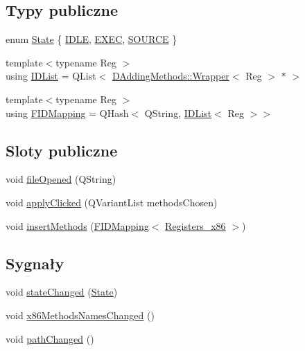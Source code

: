 \subsection*{Typy publiczne}
\begin{DoxyCompactItemize}
\item 
enum \hyperlink{class_application_manager_aeb5af7a2aa47623af5160ea1f20d0243}{State} \{ \hyperlink{class_application_manager_aeb5af7a2aa47623af5160ea1f20d0243a927b180d946b02d50c48311dbf9c3673}{I\-D\-L\-E}, 
\hyperlink{class_application_manager_aeb5af7a2aa47623af5160ea1f20d0243ab12e09b9d69a153189e8f821e9090d2c}{E\-X\-E\-C}, 
\hyperlink{class_application_manager_aeb5af7a2aa47623af5160ea1f20d0243ab5082059863677e68b76bfc68e21e882}{S\-O\-U\-R\-C\-E}
 \}
\item 
{\footnotesize template$<$typename Reg $>$ }\\using \hyperlink{class_application_manager_afc6759e44d61ba108cadcea101b30bc7}{I\-D\-List} = Q\-List$<$ \hyperlink{class_d_adding_methods_1_1_wrapper}{D\-Adding\-Methods\-::\-Wrapper}$<$ Reg $>$ $\ast$ $>$
\item 
{\footnotesize template$<$typename Reg $>$ }\\using \hyperlink{class_application_manager_a00564f65d5da07b75a4dc0d0d13c2dc1}{F\-I\-D\-Mapping} = Q\-Hash$<$ Q\-String, \hyperlink{class_application_manager_afc6759e44d61ba108cadcea101b30bc7}{I\-D\-List}$<$ Reg $>$$>$
\end{DoxyCompactItemize}
\subsection*{Sloty publiczne}
\begin{DoxyCompactItemize}
\item 
void \hyperlink{class_application_manager_abbab98616d4848114b4338c8accedef2}{file\-Opened} (Q\-String)
\item 
void \hyperlink{class_application_manager_af1a9357249748e88cdbbcb994d8a7fe0}{apply\-Clicked} (Q\-Variant\-List methods\-Chosen)
\item 
void \hyperlink{class_application_manager_ace0c5e4596d968278acd0b61042472d2}{insert\-Methods} (\hyperlink{class_application_manager_a00564f65d5da07b75a4dc0d0d13c2dc1}{F\-I\-D\-Mapping}$<$ \hyperlink{codedefines_8h_a0f84efe4ca4d99203713a78bd6e8c82e}{Registers\-\_\-x86} $>$)
\end{DoxyCompactItemize}
\subsection*{Sygnały}
\begin{DoxyCompactItemize}
\item 
void \hyperlink{class_application_manager_a0c10f4864788ee7e13730eae75d8c910}{state\-Changed} (\hyperlink{class_application_manager_aeb5af7a2aa47623af5160ea1f20d0243}{State})
\item 
void \hyperlink{class_application_manager_ac64a4e874ce1d4452d37f3b2ce996cda}{x86\-Methods\-Names\-Changed} ()
\item 
void \hyperlink{class_application_manager_ade160ce272f9e98dd59250b399ec1b82}{path\-Changed} ()
\end{DoxyCompactItemize}
